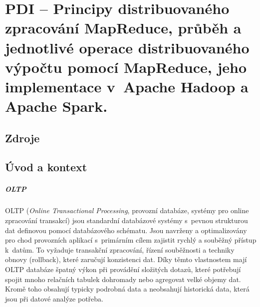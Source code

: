 

\graphicspath{{pdi/map_reduce/figures}}


\chapter{PDI -- Principy distribuovaného zpracování MapReduce, průběh a jednotlivé operace distribuovaného výpočtu pomocí MapReduce, jeho implementace v~Apache Hadoop a Apache Spark.}


\section{Zdroje}

\begin{compactitem}
    \item {}
    \item {}
    \item {}
    \item {}
\end{compactitem}


\section{Úvod a kontext}

\paragraph*{OLTP} OLTP (\textit{Online Transactional Processing}, provozní databáze, systémy pro online zpracování transakcí) jsou standardní databázové systémy s~pevnou strukturou dat definovou pomocí databázového schématu. Jsou navrženy a optimalizovány pro chod provozních aplikací s~primárním cílem zajistit rychlý a souběžný přístup k~datům. To vyžaduje transakční zpracování, řízení souběžnosti a techniky obnovy (rollback), které zaručují konzistenci dat. Díky těmto vlastnostem mají OLTP databáze špatný výkon při provádění složitých dotazů, které potřebují spojit mnoho relačních tabulek dohromady nebo agregovat velké objemy dat. Kromě toho obsahují typicky podrobná data a neobsahují historická data, která jsou při datové analýze potřeba.

